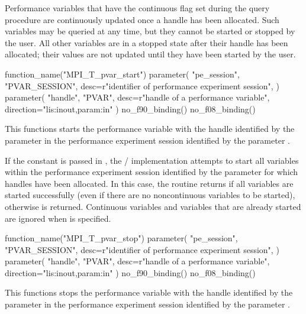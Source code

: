 Performance variables that have the continuous flag set during the query
procedure are continuously updated once a handle has been allocated.
Such variables may be queried at any time, but they cannot be started or
stopped by the user.  All other variables are in a stopped state after
their handle has been allocated; their values are not updated until they
have been started by the user.

\begin{mpi-binding}
    function_name("MPI_T_pvar_start")
    parameter(
        "pe_session",
        "PVAR_SESSION",
        desc=r"identifier of performance experiment session",
    )
    parameter(
        "handle",
        "PVAR",
        desc=r"handle of a performance variable",
        direction="lis:inout,param:in"
    )
    no_f90_binding()
    no_f08_binding()
\end{mpi-binding}

This functions starts the performance variable with the handle identified
by the parameter  in the performance experiment session identified by the parameter
.

If the constant  is passed in
, the \MPI/ implementation attempts to start all variables
within the performance experiment session identified by the parameter  for
which handles have been allocated.  In this case, the routine returns
 if all variables are started successfully (even if
there are no noncontinuous variables to be started), otherwise
 is returned.  Continuous variables
and variables that are already started are ignored when
 is specified.

\begin{mpi-binding}
    function_name("MPI_T_pvar_stop")
    parameter(
        "pe_session",
        "PVAR_SESSION",
        desc=r"identifier of performance experiment session",
    )
    parameter(
        "handle",
        "PVAR",
        desc=r"handle of a performance variable",
        direction="lis:inout,param:in"
    )
    no_f90_binding()
    no_f08_binding()
\end{mpi-binding}

This functions stops the performance variable with the handle identified by
the parameter  in the performance experiment session identified by the parameter
.

